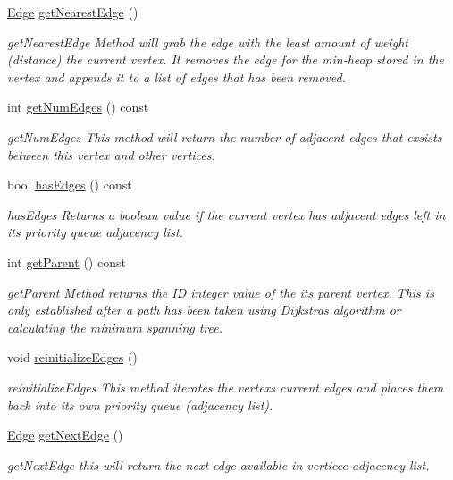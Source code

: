 \begin{DoxyCompactItemize}
\hyperlink{struct_edge}{Edge} \hyperlink{class_vertex_a32d9da19ba0b88642691f743092a6bea}{get\+Nearest\+Edge} ()
\begin{DoxyCompactList}\small\item\em get\+Nearest\+Edge Method will grab the edge with the least amount of weight (distance) the current vertex. It removes the edge for the min-\/heap stored in the vertex and appends it to a list of edges that has been removed. \end{DoxyCompactList}\item 
int \hyperlink{class_vertex_a0988796727c76d1161c656f696ee0997}{get\+Num\+Edges} () const 
\begin{DoxyCompactList}\small\item\em get\+Num\+Edges This method will return the number of adjacent edges that exsists between this vertex and other vertices. \end{DoxyCompactList}\item 
bool \hyperlink{class_vertex_ab6f75fe6517f8a56d7b033510e71a9ea}{has\+Edges} () const 
\begin{DoxyCompactList}\small\item\em has\+Edges Returns a boolean value if the current vertex has adjacent edges left in it\textquotesingle{}s priority queue adjacency list. \end{DoxyCompactList}\item 
int \hyperlink{class_vertex_a57eba4a06c19525ba9753058061c370c}{get\+Parent} () const 
\begin{DoxyCompactList}\small\item\em get\+Parent Method returns the ID integer value of the it\textquotesingle{}s parent vertex. This is only established after a path has been taken using Dijkstra\textquotesingle{}s algorithm or calculating the minimum spanning tree. \end{DoxyCompactList}\item 
void \hyperlink{class_vertex_a81f32ef92752b1b4832e026b03e0dd2b}{reinitialize\+Edges} ()
\begin{DoxyCompactList}\small\item\em reinitialize\+Edges This method iterates the vertex\textquotesingle{}s current edges and places them back into it\textquotesingle{}s own priority queue (adjacency list). \end{DoxyCompactList}\item 
\hyperlink{struct_edge}{Edge} \hyperlink{class_vertex_a4fd094f20a327502d4c5752354ed0bf1}{get\+Next\+Edge} ()
\begin{DoxyCompactList}\small\item\em get\+Next\+Edge this will return the next edge available in verticee adjacency list. \end{DoxyCompactList}\item 

\end{DoxyCompactItemize}
